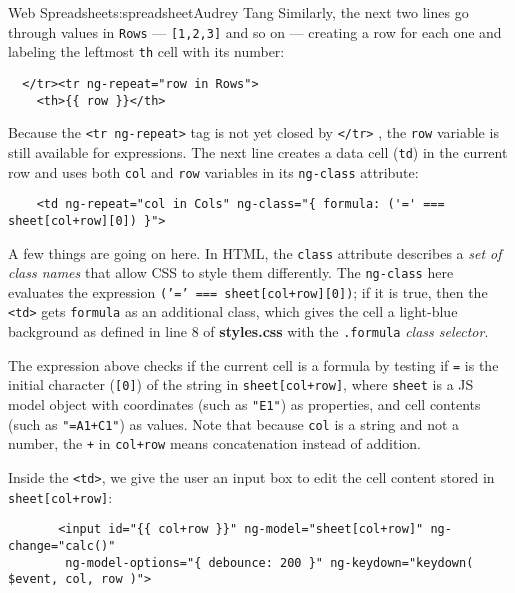 \begin{aosachapter}{Web Spreadsheet}{s:spreadsheet}{Audrey Tang}
Similarly, the next two lines go through values in \texttt{Rows} ---
\texttt{{[}1,2,3{]}} and so on --- creating a row for each one and
labeling the leftmost \texttt{th} cell with its number:

\begin{verbatim}
  </tr><tr ng-repeat="row in Rows">
    <th>{{ row }}</th>
\end{verbatim}

Because the \texttt{\textless{}tr ng-repeat\textgreater{}} tag is not
yet closed by \texttt{\textless{}/tr\textgreater{}} , the \texttt{row}
variable is still available for expressions. The next line creates a
data cell (\texttt{td}) in the current row and uses both \texttt{col}
and \texttt{row} variables in its \texttt{ng-class} attribute:

\begin{verbatim}
    <td ng-repeat="col in Cols" ng-class="{ formula: ('=' === sheet[col+row][0]) }">
\end{verbatim}

A few things are going on here. In HTML, the \texttt{class} attribute
describes a \emph{set of class names} that allow CSS to style them
differently. The \texttt{ng-class} here evaluates the expression
\texttt{('=' === sheet{[}col+row{]}{[}0{]})}; if it is true, then the
\texttt{\textless{}td\textgreater{}} gets \texttt{formula} as an
additional class, which gives the cell a light-blue background as
defined in line 8 of \textbf{styles.css} with the \texttt{.formula}
\emph{class selector}.

The expression above checks if the current cell is a formula by testing
if \texttt{=} is the initial character (\texttt{{[}0{]}}) of the string
in \texttt{sheet{[}col+row{]}}, where \texttt{sheet} is a JS model
object with coordinates (such as \texttt{"E1"}) as properties, and cell
contents (such as \texttt{"=A1+C1"}) as values. Note that because
\texttt{col} is a string and not a number, the \texttt{+} in
\texttt{col+row} means concatenation instead of addition.

Inside the \texttt{\textless{}td\textgreater{}}, we give the user an
input box to edit the cell content stored in
\texttt{sheet{[}col+row{]}}:

\begin{verbatim}
       <input id="{{ col+row }}" ng-model="sheet[col+row]" ng-change="calc()"
        ng-model-options="{ debounce: 200 }" ng-keydown="keydown( $event, col, row )">
\end{verbatim}


\end{aosachapter}
